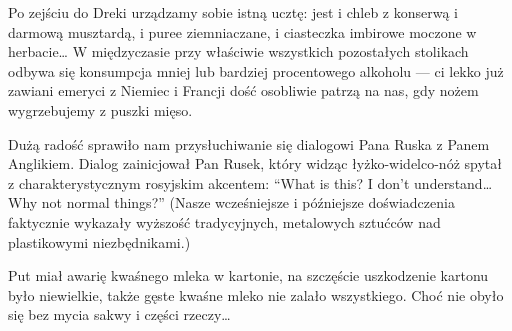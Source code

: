 
Po zejściu do Dreki urządzamy sobie istną ucztę: jest i chleb z konserwą i darmową musztardą, i puree ziemniaczane, i ciasteczka imbirowe moczone w herbacie… W międzyczasie przy właściwie wszystkich pozostałych stolikach odbywa się konsumpcja mniej lub bardziej procentowego alkoholu --- ci lekko już zawiani emeryci z Niemiec i Francji dość osobliwie patrzą na nas, gdy nożem wygrzebujemy z puszki mięso.

Dużą radość sprawiło nam przysłuchiwanie się dialogowi Pana Ruska z Panem Anglikiem. Dialog zainicjował Pan Rusek, który widząc łyżko-widelco-nóż spytał z charakterystycznym rosyjskim akcentem: “What is this? I don’t understand… Why not normal things?” (Nasze wcześniejsze i późniejsze doświadczenia faktycznie wykazały wyższość tradycyjnych, metalowych sztućców nad plastikowymi niezbędnikami.)

Put miał awarię kwaśnego mleka w kartonie, na szczęście uszkodzenie kartonu było niewielkie, także gęste kwaśne mleko nie zalało wszystkiego. Choć nie obyło się bez mycia sakwy i części rzeczy…


